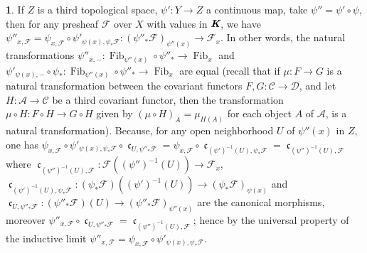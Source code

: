 \documentclass[12pt]{amsart}
\newcommand{\Fib}{\operatorname{Fib}}
\newcommand{\can}{\operatorname{\mathfrak{c}}}
\theoremstyle{definition}
\newtheorem{bk}[proposition]{}
\begin{document}
\begin{bk}
If $Z$ is a third topological space, $\psi':Y\rightarrow Z$ a continuous map, take $\psi''=\psi'\circ\psi$, then for any presheaf $\mathscr{F}$ over $X$ with values in $\emph{\textbf{K}}$, we have $\psi''_{x,\mathscr{F}}=
\psi_{x,\mathscr{F}}\circ\psi'_{\psi(x),\psi_{\ast}\mathscr{F}}:
(\psi''_{\ast}\mathscr{F})_{\psi''(x)}\rightarrow\mathscr{F}_{x}$. In other words, the natural transformations $\psi''_{x,-}:\Fib_{\psi''(x)}\circ\psi''_{\ast}\rightarrow\Fib_{x}$ and $\psi'_{\psi(x),-}\circ\psi_{\ast}:
\Fib_{\psi''(x)}\circ\psi''_{\ast}\rightarrow\Fib_{x}$ are equal (recall that if $\mu:F\rightarrow G$ is a natural transformation between the covariant functors $F,G:\mathscr{C}\rightarrow\mathscr{D}$, and let $H:\mathscr{A}\rightarrow\mathscr{C}$ be a third covariant functor, then the transformation $\mu\circ H:F\circ H\rightarrow G\circ H$ given by $(\mu\circ H)_{A}=\mu_{H(A)}$ for each object $A$ of $\mathscr{A}$, is a natural transformation). Because, for any open neighborhood $U$ of $\psi''(x)$ in $Z$, one has $\psi_{x,\mathscr{F}}\circ\psi'_{\psi(x),\psi_{\ast}\mathscr{F}}
\circ\can_{U,\psi''_{\ast}\mathscr{F}}=
\psi_{x,\mathscr{F}}\circ\can_{(\psi')^{-1}(U),\psi_{\ast}\mathscr{F}}=
\can_{(\psi'')^{-1}(U),\mathscr{F}}$ where
 $\can_{(\psi'')^{-1}(U),\mathscr{F}}:\mathscr{F}((\psi'')^{-1}(U))
 \rightarrow\mathscr{F}_{x}$, $\can_{(\psi')^{-1}(U),\psi_{\ast}\mathscr{F}}:
 (\psi_{\ast}\mathscr{F})((\psi')^{-1}(U))
 \rightarrow(\psi_{\ast}\mathscr{F})_{\psi(x)}$ and $\can_{U,\psi''_{\ast}\mathscr{F}}:(\psi''_{\ast}\mathscr{F})(U)
 \rightarrow(\psi''_{\ast}\mathscr{F})_{\psi''(x)}$ are the canonical morphisms, moreover $\psi''_{x,\mathscr{F}}\circ\can_{U,\psi''_{\ast}\mathscr{F}}=
 \can_{(\psi'')^{-1}(U),\mathscr{F}}$; hence by the universal property of the inductive limit $\psi''_{x,\mathscr{F}}=
\psi_{x,\mathscr{F}}\circ\psi'_{\psi(x),\psi_{\ast}\mathscr{F}}$.\\
\end{bk}
\end{document}
